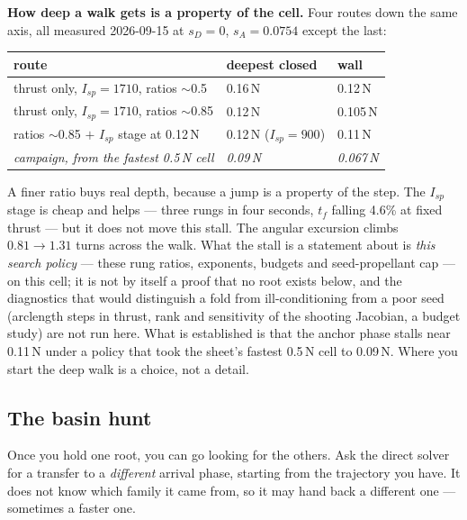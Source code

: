 \documentclass[11pt]{article}
\newcommand{\tf}{t_f}\newcommand{\R}{\mathbb{R}}
\newcommand{\sD}{s_D}\newcommand{\sA}{s_A}
\begin{document}
\begin{rig}
\textbf{How deep a walk gets is a property of the cell.} Four routes down the
same axis, all measured 2026-09-15 at $\sD=0$, $\sA=0.0754$ except the last:

\begin{center}\small
\begin{tabular}{@{}lll@{}}
\toprule
route & deepest closed & wall \\
\midrule
thrust only, $I_{sp}=1710$, ratios $\sim$0.5 & 0.16\,N & 0.12\,N \\
thrust only, $I_{sp}=1710$, ratios $\sim$0.85 & 0.12\,N & 0.105\,N \\
ratios $\sim$0.85 $+$ $I_{sp}$ stage at 0.12\,N & 0.12\,N ($I_{sp}=900$) & 0.11\,N \\
\emph{campaign, from the fastest 0.5\,N cell} & \emph{0.09\,N} & \emph{0.067\,N} \\
\bottomrule
\end{tabular}
\end{center}

\noindent
A finer ratio buys real depth, because a jump is a property of the step. The
$I_{sp}$ stage is cheap and helps --- three rungs in four seconds, $\tf$
falling 4.6\% at fixed thrust --- but it does not move this stall. The
angular excursion climbs $0.81 \to 1.31$ turns across the walk. What the
stall is a statement about is \emph{this search policy} --- these rung
ratios, exponents, budgets and seed-propellant cap --- on this cell; it is
not by itself a proof that no root exists below, and the diagnostics that
would distinguish a fold from ill-conditioning from a poor seed (arclength
steps in thrust, rank and sensitivity of the shooting Jacobian, a budget
study) are not run here. What is established is that the anchor phase stalls
near 0.11\,N under a policy that took the sheet's fastest 0.5\,N cell to
0.09\,N. Where you start the deep walk is a choice, not a detail.
\end{rig}

\subsection{The basin hunt}

\begin{eli}
Once you hold one root, you can go looking for the others. Ask the direct
solver for a transfer to a \emph{different} arrival phase, starting from the
trajectory you have. It does not know which family it came from, so it may
hand back a different one --- sometimes a faster one.
\end{eli}
\end{document}
